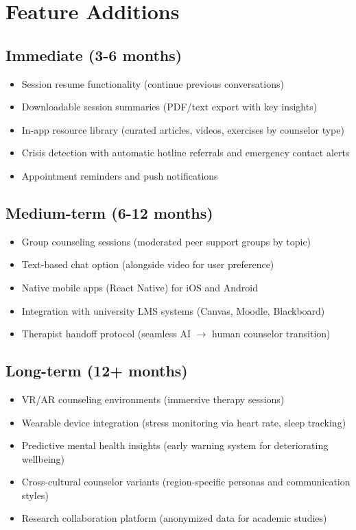 \documentclass[11pt,a4paper]{report}
\begin{document}
\section{Feature Additions}

\subsection{Immediate (3-6 months)}
\begin{itemize}
    \item Session resume functionality (continue previous conversations)
    \item Downloadable session summaries (PDF/text export with key insights)
    \item In-app resource library (curated articles, videos, exercises by counselor type)
    \item Crisis detection with automatic hotline referrals and emergency contact alerts
    \item Appointment reminders and push notifications
\end{itemize}

\subsection{Medium-term (6-12 months)}
\begin{itemize}
    \item Group counseling sessions (moderated peer support groups by topic)
    \item Text-based chat option (alongside video for user preference)
    \item Native mobile apps (React Native) for iOS and Android
    \item Integration with university LMS systems (Canvas, Moodle, Blackboard)
    \item Therapist handoff protocol (seamless AI $\rightarrow$ human counselor transition)
\end{itemize}

\subsection{Long-term (12+ months)}
\begin{itemize}
    \item VR/AR counseling environments (immersive therapy sessions)
    \item Wearable device integration (stress monitoring via heart rate, sleep tracking)
    \item Predictive mental health insights (early warning system for deteriorating wellbeing)
    \item Cross-cultural counselor variants (region-specific personas and communication styles)
    \item Research collaboration platform (anonymized data for academic studies)
\end{itemize}
\end{document}
